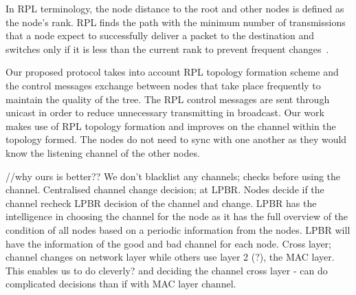 In RPL terminology, the node distance to the root and other nodes is defined as the node's rank. RPL finds the path with the minimum number of transmissions that a node expect to successfully deliver a packet to the destination and switches only if it is less than the current rank to prevent frequent changes~\cite{mrhof}. 






Our proposed protocol takes into account RPL topology formation scheme and the control messages exchange between nodes that take place frequently to maintain the quality of the tree. The RPL control messages are sent through unicast in order to reduce unnecessary transmitting in broadcast. Our work makes use of RPL topology formation and improves on the channel within the topology formed. The nodes do not need to sync with one another as they would know the listening channel of the other nodes.

//why ours is better??
We don't blacklist any channels; checks before using the channel. Centralised channel change decision; at LPBR. Nodes decide if the channel recheck LPBR decision of the channel and change. LPBR has the intelligence in choosing the channel for the node as it has the full overview of the condition of all nodes based on a periodic information from the nodes. LPBR will have the information of the good and bad channel for each node. 
Cross layer; channel changes on network layer while others use layer 2 (?), the MAC layer. This enables us to do cleverly? and deciding the channel cross layer - can do complicated decisions than if with MAC layer channel.


